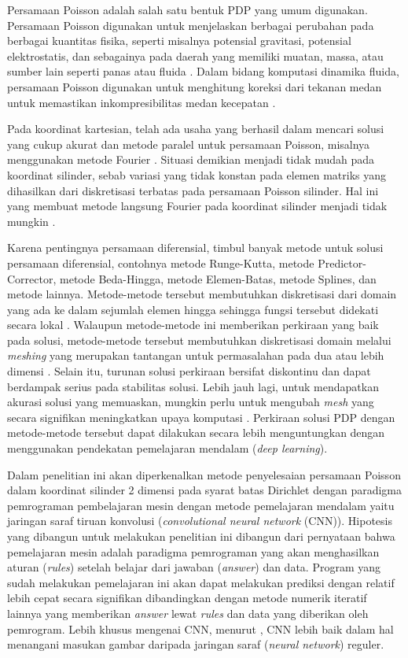 Persamaan Poisson adalah salah satu bentuk PDP yang umum digunakan. Persamaan Poisson digunakan untuk menjelaskan berbagai perubahan pada berbagai kuantitas fisika, seperti misalnya potensial gravitasi, potensial elektrostatis, dan sebagainya pada daerah yang memiliki muatan, massa, atau sumber lain seperti panas atau fluida \citep{boas_2006_mathematical}. Dalam bidang komputasi dinamika fluida, persamaan Poisson digunakan untuk menghitung koreksi dari tekanan medan untuk memastikan inkompresibilitas medan kecepatan \citep{Ozbay2021}.

Pada koordinat kartesian, telah ada usaha yang berhasil dalam mencari solusi yang cukup akurat dan metode paralel untuk persamaan Poisson, misalnya menggunakan metode Fourier \citep{cohl_1999}. Situasi demikian menjadi tidak mudah pada koordinat silinder, sebab variasi yang tidak konstan pada elemen matriks yang dihasilkan dari diskretisasi terbatas pada persamaan Poisson silinder. Hal ini yang membuat metode langsung Fourier pada koordinat silinder menjadi tidak mungkin \citep{cohl_1999}.

Karena pentingnya persamaan diferensial, timbul banyak metode untuk solusi persamaan diferensial, contohnya metode Runge-Kutta, metode Predictor- Corrector, metode Beda-Hingga, metode Elemen-Batas, metode Splines, dan metode lainnya. Metode-metode tersebut membutuhkan diskretisasi dari domain yang ada ke dalam sejumlah elemen hingga sehingga fungsi tersebut didekati secara lokal \citep{kumar_yadav_2011}. Walaupun metode-metode ini memberikan perkiraan yang baik pada solusi, metode-metode tersebut membutuhkan diskretisasi domain melalui \emph{meshing} yang merupakan tantangan untuk permasalahan pada dua atau lebih dimensi \citep{kumar_yadav_2011}. Selain itu, turunan solusi perkiraan bersifat diskontinu dan dapat berdampak serius pada stabilitas solusi. Lebih jauh lagi, untuk mendapatkan akurasi solusi yang memuaskan, mungkin perlu untuk mengubah \emph{mesh} yang secara signifikan meningkatkan upaya komputasi \citep{kumar_yadav_2011}. Perkiraan solusi PDP dengan metode-metode tersebut dapat dilakukan secara lebih menguntungkan dengan menggunakan pendekatan pemelajaran mendalam (\emph{deep learning}).

Dalam penelitian ini akan diperkenalkan metode penyelesaian persamaan Poisson dalam koordinat silinder 2 dimensi pada syarat batas Dirichlet dengan paradigma pemrograman pembelajaran mesin dengan metode pemelajaran mendalam yaitu jaringan saraf tiruan konvolusi (\emph{convolutional neural network} (CNN)). Hipotesis yang dibangun untuk melakukan penelitian ini dibangun dari pernyataan \cite{moroney_2022} bahwa pemelajaran mesin adalah paradigma pemrograman yang akan menghasilkan aturan (\emph{rules}) setelah belajar dari jawaban (\emph{answer}) dan data. Program yang sudah melakukan pemelajaran ini akan dapat melakukan prediksi dengan relatif lebih cepat secara signifikan dibandingkan dengan metode numerik iteratif lainnya yang memberikan \emph{answer} lewat \emph{rules} dan data yang diberikan oleh pemrogram. Lebih khusus mengenai CNN, menurut \cite{Li_Li_Gao}, CNN lebih baik dalam hal menangani masukan gambar daripada jaringan saraf (\emph{neural network}) reguler.

